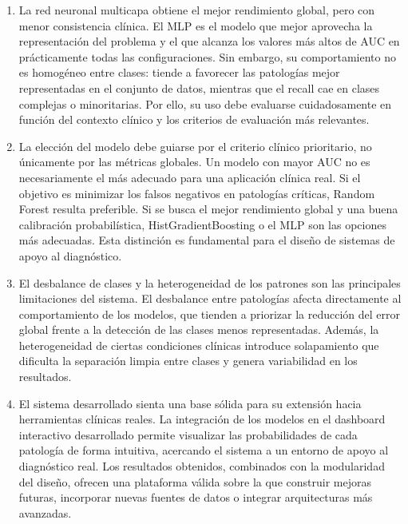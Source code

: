 \documentclass[12pt,a4paper,twoside]{book}
\begin{document}
\begin{enumerate}
	Aunque no es el modelo con mayor rendimiento global, Random Forest destaca por mantener recalls altos de forma consistente en las patologías de mayor riesgo clínico, como el infarto de miocardio (MI) y las alteraciones de conducción (CD). 
	Su patrón de decisión tiende a priorizar la sensibilidad frente a la precisión, reduciendo el riesgo de falsos negativos, lo cual resulta especialmente valioso en entornos clínicos donde no detectar una patología grave supone un riesgo mayor que una alarma falsa.
	\item La red neuronal multicapa obtiene el mejor rendimiento global, pero con menor consistencia clínica. 
	El MLP es el modelo que mejor aprovecha la representación del problema y el que alcanza los valores más altos de AUC en prácticamente todas las configuraciones. Sin embargo, su comportamiento no es homogéneo entre clases: tiende a favorecer las patologías mejor representadas en el conjunto de datos, mientras que el recall cae en clases complejas o minoritarias. 
	Por ello, su uso debe evaluarse cuidadosamente en función del contexto clínico y los criterios de evaluación más relevantes.
	\item La elección del modelo debe guiarse por el criterio clínico prioritario, no únicamente por las métricas globales. 
	Un modelo con mayor AUC no es necesariamente el más adecuado para una aplicación clínica real. Si el objetivo es minimizar los falsos negativos en patologías críticas, Random Forest resulta preferible. Si se busca el mejor rendimiento global y una buena calibración probabilística, HistGradientBoosting o el MLP son las opciones más adecuadas. 
	Esta distinción es fundamental para el diseño de sistemas de apoyo al diagnóstico.
	\item El desbalance de clases y la heterogeneidad de los patrones son las principales limitaciones del sistema. 
	El desbalance entre patologías afecta directamente al comportamiento de los modelos, que tienden a priorizar la reducción del error global frente a la detección de las clases menos representadas. 
	Además, la heterogeneidad de ciertas condiciones clínicas introduce solapamiento que dificulta la separación limpia entre clases y genera variabilidad en los resultados.
	\item El sistema desarrollado sienta una base sólida para su extensión hacia herramientas clínicas reales. 
	La integración de los modelos en el dashboard interactivo desarrollado permite visualizar las probabilidades de cada patología de forma intuitiva, acercando el sistema a un entorno de apoyo al diagnóstico real. 
	Los resultados obtenidos, combinados con la modularidad del diseño, ofrecen una plataforma válida sobre la que construir mejoras futuras, incorporar nuevas fuentes de datos o integrar arquitecturas más avanzadas.
\end{enumerate}
\end{document}
